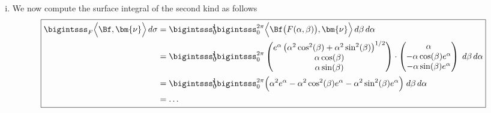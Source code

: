 \documentclass[12pt]{article}
\begin{document}
\begin{enumerate}[(i)]
	\item We now compute the surface integral of the second kind as follows
	      \begin{align}
		      \boxed{
			      \begin{aligned}
				      \bigintsss_F
				      \Big\langle \Bf , \bm{\nu} \Big\rangle \,d\sigma
				       & = \bigintsss_0^1 \!\!\! \bigintsss_0^{2\pi}
				      \Big\langle \Bf\big(F(\alpha,\beta)\big), \bm{\nu} \Big\rangle
				      \,d\beta \, d\alpha                                                                                               \\
				       & = \bigintsss_0^1 \!\!\! \bigintsss_0^{2\pi}
				      \begin{pmatrix}
					      e^\alpha\left(\alpha^2\cos^2(\beta)+\alpha^2\sin^2(\beta)\right)^{1/2} \\ 
					      \alpha\cos(\beta)                                                      \\
					      \alpha\sin(\beta)
				      \end{pmatrix}
				      \cdot
				      \begin{pmatrix}
					      \alpha                     \\ 
					      -\alpha\cos(\beta)e^\alpha \\ 
					      -\alpha\sin(\beta)e^\alpha
				      \end{pmatrix}\;  d\beta \,  d\alpha                                                                               \\
				       & = 
				      \bigintsss_0^1 \!\!\! \bigintsss_0^{2\pi}
				      \Big( \alpha^2 e^\alpha - \alpha^2\cos^2(\beta)e^\alpha - \alpha^2\sin^2(\beta)e^\alpha \Big)\; d\beta \, d\alpha \\
				       & = \dots
			      \end{aligned}
		      }
	      \end{align}
\end{enumerate}

\clearpage
\end{document}
